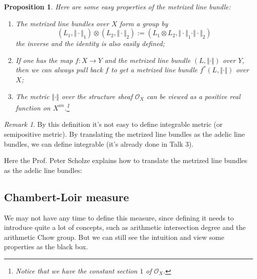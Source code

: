 \documentclass[reqno,11pt]{amsart}
\numberwithin{equation}{section}
\theoremstyle{plain}
\newtheorem{proposition}[theorem]{Proposition}
\theoremstyle{plain}
\numberwithin{equation}{section}
\theoremstyle{remark}
\newtheorem{remark}[theorem]{Remark}
\newcommand{\norm}[1]{\Vert{#1}\Vert}
\begin{document}
\begin{proposition}
Here are some easy properties of the metrized line bundle:
\begin{enumerate}[(1)]
\item The metrized line bundles over $X$ form a group by
$$(L_1,\norm{\cdot}_1) \otimes (L_2,\norm{\cdot}_2):=(L_1 \otimes L_2, \norm{\cdot}_1\cdot \norm{\cdot}_2)$$
the inverse and the identity is also easily defined;
\item If one has the map $f:X \longrightarrow Y$ and the metrized line bundle $(L,\norm{\cdot})$ over $Y$, then we can always pull back $f$ to get a metrized line bundle $f^*(L,\norm{\cdot})$ over $X$;
\item The metric $\norm{\cdot}$ over the structure sheaf $\mathcal{O}_X$ can be viewed as a positive real function on $X^{an}$.\footnote{Notice that we have the constant section $1$ of $\mathcal{O}_X$.}
\end{enumerate} 
\end{proposition}
\begin{remark}
By this definition it's not easy to define integrable metric (or semipositive metric). By translating the metrized line bundles as the adelic line bundles, we can define integrable (it's already done in Talk 3).
\end{remark}
Here the Prof. Peter Scholze explains how to translate the metrized line bundles as the adelic line bundles:


\subsection{Chambert-Loir measure}
We may not have any time to define this measure, since defining it needs to introduce quite a lot of concepts, such as arithmetic intersection degree and the arithmetic Chow group. But we can still see the intuition and view some properties as the black box.
\end{document}
